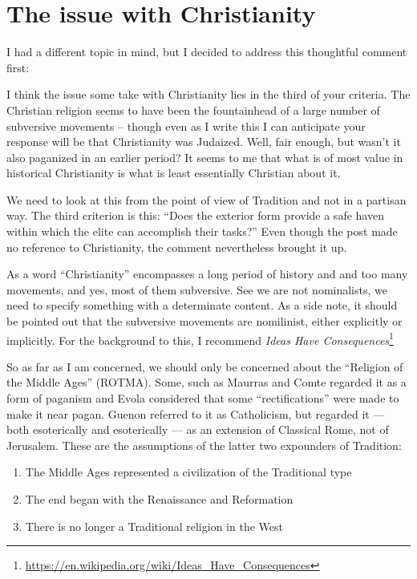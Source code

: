 \section{The issue with Christianity}

I had a different topic in mind, but I decided to address this thoughtful comment first:

\begin{quotex}
I think the issue some take with Christianity lies in the third of your criteria. The Christian religion seems to have been the fountainhead of a large number of subversive movements -- though even as I write this I can anticipate your response will be that Christianity was Judaized. Well, fair enough, but wasn't it also paganized in an earlier period? It seems to me that what is of most value in historical Christianity is what is least essentially Christian about it.
\end{quotex}


We need to look at this from the point of view of Tradition and not in a partisan way. The third criterion is this: ``Does the exterior form provide a safe haven within which the elite can accomplish their tasks?'' Even though the post made no reference to Christianity, the comment nevertheless brought it up.

As a word ``Christianity'' encompasses a long period of history and and too many movements, and yes, most of them subversive. See we are not nominalists, we need to specify something with a determinate content. As a side note, it should be pointed out that the subversive movements are nomilinist, either explicitly or implicitly. For the background to this, I recommend \textit{Ideas Have Consequences}\footnote{\url{https://en.wikipedia.org/wiki/Ideas\_Have\_Consequences}}

So as far as I am concerned, we should only be concerned about the ``Religion of the Middle Ages'' (ROTMA). Some, such as Maurras and Comte regarded it as a form of paganism and Evola considered that some ``rectifications'' were made to make it near pagan. Guenon referred to it as Catholicism, but regarded it --- both esoterically and esoterically --- as an extension of Classical Rome, not of Jerusalem. These are the assumptions of the latter two expounders of Tradition:

\begin{enumerate}


\item The Middle Ages represented a civilization of the Traditional type

\item The end began with the Renaissance and Reformation

\item There is no longer a Traditional religion in the West
\end{enumerate}


